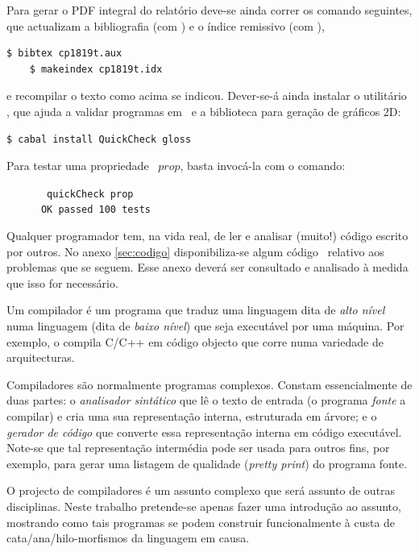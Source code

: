 \documentclass[a4paper]{article}
\let\uk=\emph
\newcommand{\Varid}[1]{\mathit{#1}}
\begin{document}
Para gerar o PDF integral do relatório deve-se ainda correr os comando seguintes,
que actualizam a bibliografia (com \Bibtex) e o índice remissivo (com \Makeindex),
\begin{Verbatim}[fontsize=\small]
    $ bibtex cp1819t.aux
    $ makeindex cp1819t.idx
\end{Verbatim}
e recompilar o texto como acima se indicou. Dever-se-á ainda instalar o utilitário
\QuickCheck,
que ajuda a validar programas em \Haskell\ e a biblioteca  para
geração de gráficos 2D:
\begin{Verbatim}[fontsize=\small]
    $ cabal install QuickCheck gloss
\end{Verbatim}
Para testar uma propriedade \QuickCheck~\ensuremath{\Varid{prop}}, basta invocá-la com o comando:
\begin{tabbing}\tt
~~~~~~quickCheck~prop\\
\tt ~~~~~~OK~passed~100~tests
\end{tabbing}

Qualquer programador tem, na vida real, de ler e analisar (muito!) código
escrito por outros. No anexo \ref{sec:codigo} disponibiliza-se algum
código \Haskell\ relativo aos problemas que se seguem. Esse anexo deverá
ser consultado e analisado à medida que isso for necessário.

\Problema

Um compilador é um programa que traduz uma linguagem dita de
\emph{alto nível} numa linguagem (dita de \emph{baixo nível}) que
seja executável por uma máquina.
Por exemplo, o  compila C/C++ em código objecto que
corre numa variedade de arquitecturas.

Compiladores são normalmente programas complexos.
Constam essencialmente de duas partes:
o \emph{analisador sintático} que lê o texto de entrada
(o programa \emph{fonte} a compilar) e cria uma sua representação
interna, estruturada em árvore;
e o \emph{gerador de código} que converte essa representação interna
em código executável.
Note-se que tal representação intermédia pode ser usada para outros fins,
por exemplo,
para gerar uma listagem de qualidade (\uk{pretty print}) do programa fonte.

O projecto de compiladores é um assunto complexo que
será assunto de outras disciplinas.
Neste trabalho pretende-se apenas fazer uma introdução ao assunto,
mostrando como tais programas se podem construir funcionalmente à custa de
cata/ana/hilo-morfismos da linguagem em causa.
\end{document}
